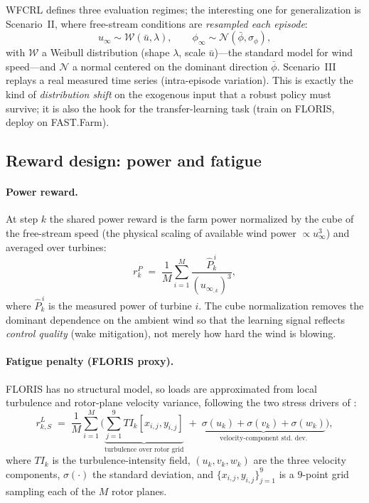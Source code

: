 \documentclass[11pt]{article}
\theoremstyle{plain}
\theoremstyle{definition}
\newcommand{\calN}{\mathcal{N}}
\newcommand{\calW}{\mathcal{W}}
\newcommand{\wind}{u_{\infty}}
\newcommand{\dir}{\phi_{\infty}}
\begin{document}
WFCRL defines three evaluation regimes; the interesting one for
generalization is Scenario~II, where free-stream conditions are \emph{resampled
each episode}:
\begin{equation}
  \wind \sim \calW(\bar u,\lambda),
  \qquad
  \dir \sim \calN(\bar\phi,\sigma_\phi),
  \label{eq:windsample}
\end{equation}
with $\calW$ a Weibull distribution (shape $\lambda$, scale $\bar u$)---the
standard model for wind speed---and $\calN$ a normal centered on the dominant
direction $\bar\phi$. Scenario~III replays a real measured time series
(intra-episode variation). This is exactly the kind of \emph{distribution
shift} on the exogenous input that a robust policy must survive; it is also the
hook for the transfer-learning task (train on FLORIS, deploy on FAST.Farm).

\subsection{Reward design: power and fatigue}
\label{sec:rewards}

\paragraph{Power reward.} At step $k$ the shared power reward is the farm
power normalized by the cube of the free-stream speed (the physical scaling of
available wind power $\propto \wind^3$) and averaged over turbines:
\begin{equation}
  r^{P}_{k} \;=\; \frac{1}{M}\sum_{i=1}^{M}
  \frac{\hat P^{\,i}_{k}}{(\wind_{,k})^{3}},
  \label{eq:powerreward}
\end{equation}
where $\hat P^{\,i}_k$ is the measured power of turbine $i$. The cube
normalization removes the dominant dependence on the ambient wind so that the
learning signal reflects \emph{control quality} (wake mitigation), not merely
how hard the wind is blowing.

\paragraph{Fatigue penalty (FLORIS proxy).} FLORIS has no structural model, so
loads are approximated from local turbulence and rotor-plane velocity variance,
following the two stress drivers of \cite{P1}:
\begin{equation}
  r^{L}_{k,S} \;=\; \frac{1}{M}\sum_{i=1}^{M}
  \Bigg(\underbrace{\sum_{j=1}^{9} TI_k[x_{i,j},y_{i,j}]}_{\text{turbulence over rotor grid}}
  \;+\;\underbrace{\sigma(u_k)+\sigma(v_k)+\sigma(w_k)}_{\text{velocity-component std.\ dev.}}\Bigg),
  \label{eq:floadproxy}
\end{equation}
where $TI_k$ is the turbulence-intensity field, $(u_k,v_k,w_k)$ are the three
velocity components, $\sigma(\cdot)$ the standard deviation, and $\{x_{i,j},
y_{i,j}\}_{j=1}^{9}$ is a $9$-point grid sampling each of the $M$ rotor planes.
\end{document}
